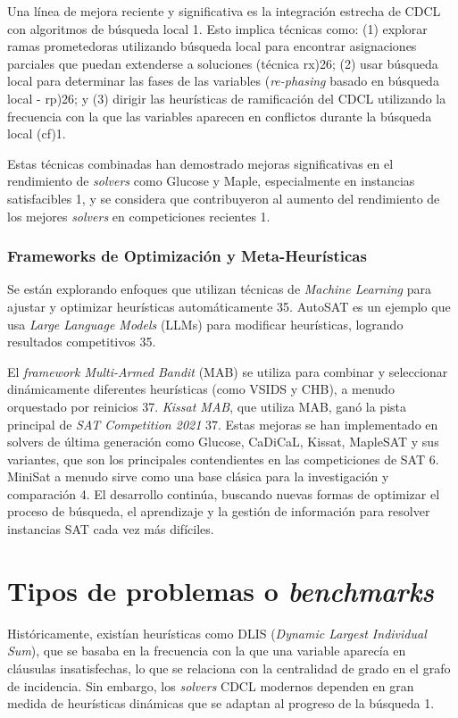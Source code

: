 Una línea de mejora reciente y significativa es la integración estrecha de CDCL con algoritmos de búsqueda local 1. Esto implica técnicas como: (1) explorar ramas prometedoras utilizando búsqueda local para encontrar asignaciones parciales que puedan extenderse a soluciones (técnica rx)26; (2) usar búsqueda local para determinar las fases de las variables (\textit{re-phasing} basado en búsqueda local - rp)26; y (3) dirigir las heurísticas de ramificación del CDCL utilizando la frecuencia con la que las variables aparecen en conflictos durante la búsqueda local (cf)1.

Estas técnicas combinadas han demostrado mejoras significativas en el rendimiento de \textit{solvers} como Glucose y Maple, especialmente en instancias satisfacibles 1, y se considera que contribuyeron al aumento del rendimiento de los mejores \textit{solvers} en competiciones recientes 1.

\subsubsection{Frameworks de Optimización y Meta-Heurísticas}

Se están explorando enfoques que utilizan técnicas de \textit{Machine Learning} para ajustar y optimizar heurísticas automáticamente 35. AutoSAT es un ejemplo que usa \textit{Large Language Models} (LLMs) para modificar heurísticas, logrando resultados competitivos 35.

El \textit{framework Multi-Armed Bandit} (MAB) se utiliza para combinar y seleccionar dinámicamente diferentes heurísticas (como VSIDS y CHB), a menudo orquestado por reinicios 37. \textit{Kissat MAB}, que utiliza MAB, ganó la pista principal de \textit{SAT Competition 2021} 37.
Estas mejoras se han implementado en solvers de última generación como Glucose, CaDiCaL, Kissat, MapleSAT y sus variantes, que son los principales contendientes en las competiciones de SAT 6. MiniSat a menudo sirve como una base clásica para la investigación y comparación 4. El desarrollo continúa, buscando nuevas formas de optimizar el proceso de búsqueda, el aprendizaje y la gestión de información para resolver instancias SAT cada vez más difíciles.

\section{Tipos de problemas o \textit{benchmarks}}
Históricamente, existían heurísticas como DLIS (\textit{Dynamic Largest Individual Sum}), que se basaba en la frecuencia con la que una variable aparecía en cláusulas insatisfechas, lo que se relaciona con la centralidad de grado en el grafo de incidencia. Sin embargo, los \textit{solvers} CDCL modernos dependen en gran medida de heurísticas dinámicas que se adaptan al progreso de la búsqueda 1.

